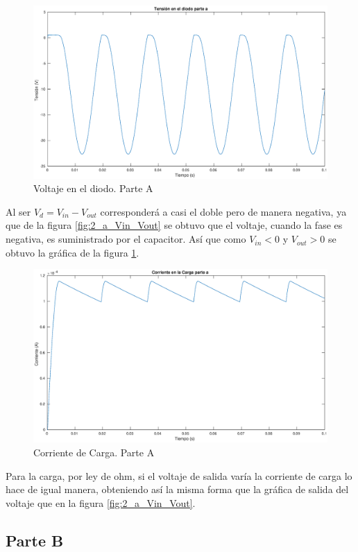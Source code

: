 \documentclass[12pt,letterpaper]{article}
\begin{document}
\begin{figure}[ht!]
  \centering
  \includegraphics[width=0.8\linewidth]{pictures/Ejercicio2_a_Vd.eps}
  \caption{Voltaje en el diodo. Parte A}
  \label{fig:2_a_Vd}
\end{figure}

Al ser $V_d = V_{in}-V_{out}$ corresponderá a casi el doble pero de manera negativa, ya que de la figura \ref{fig:2_a_Vin_Vout} se obtuvo que el voltaje, cuando la fase es negativa, es suministrado por el capacitor. Así que como $V_{in} < 0$ y $V_{out} > 0$ se obtuvo la gráfica de la figura \ref{fig:2_a_Vd}.

\begin{figure}[ht!]
  \centering
  \includegraphics[width=0.8\linewidth]{pictures/Ejercicio2_a_carga.eps}
  \caption{Corriente de Carga. Parte A}
  \label{fig:2_a_carga}
\end{figure}
Para la carga, por ley de ohm, si el voltaje de salida varía la corriente de carga lo hace de igual manera, obteniendo así la misma forma que la gráfica de salida del voltaje que en la figura \ref{fig:2_a_Vin_Vout}. 

\subsection{Parte B}
\end{document}
